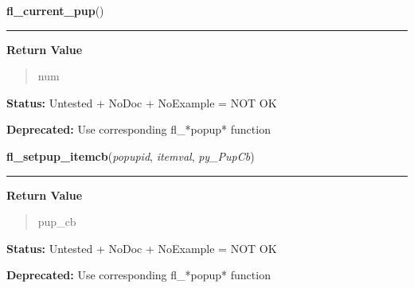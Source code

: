     \label{xformslib:library:fl_current_pup}

    \vspace{0.5ex}

\hspace{.8\funcindent}\begin{boxedminipage}{\funcwidth}

    \raggedright \textbf{fl\_current\_pup}()

    \vspace{-1.5ex}

    \rule{\textwidth}{0.5\fboxrule}
\setlength{\parskip}{2ex}
\setlength{\parskip}{1ex}
      \textbf{Return Value}
    \vspace{-1ex}

      \begin{quote}
      num

      \end{quote}

\textbf{Status:} Untested + NoDoc + NoExample = NOT OK



\textbf{Deprecated:} Use corresponding fl\_*popup* function



    \end{boxedminipage}

    \label{xformslib:library:fl_setpup_itemcb}

    \vspace{0.5ex}

\hspace{.8\funcindent}\begin{boxedminipage}{\funcwidth}

    \raggedright \textbf{fl\_setpup\_itemcb}(\textit{popupid}, \textit{itemval}, \textit{py\_PupCb})

    \vspace{-1.5ex}

    \rule{\textwidth}{0.5\fboxrule}
\setlength{\parskip}{2ex}
\setlength{\parskip}{1ex}
      \textbf{Return Value}
    \vspace{-1ex}

      \begin{quote}
      pup\_cb

      \end{quote}

\textbf{Status:} Untested + NoDoc + NoExample = NOT OK



\textbf{Deprecated:} Use corresponding fl\_*popup* function



    \end{boxedminipage}

